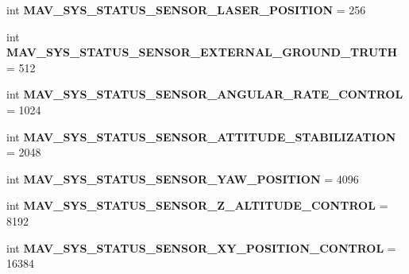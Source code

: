 \begin{DoxyCompactItemize}
int {\bfseries M\+A\+V\+\_\+\+S\+Y\+S\+\_\+\+S\+T\+A\+T\+U\+S\+\_\+\+S\+E\+N\+S\+O\+R\+\_\+\+L\+A\+S\+E\+R\+\_\+\+P\+O\+S\+I\+T\+I\+ON} = 256
\item 
\mbox{\label{namespacepymavlink_1_1dialects_1_1v10_a670a69e7105688ab55ffa0b475bb9c43}} 
int {\bfseries M\+A\+V\+\_\+\+S\+Y\+S\+\_\+\+S\+T\+A\+T\+U\+S\+\_\+\+S\+E\+N\+S\+O\+R\+\_\+\+E\+X\+T\+E\+R\+N\+A\+L\+\_\+\+G\+R\+O\+U\+N\+D\+\_\+\+T\+R\+U\+TH} = 512
\item 
\mbox{\label{namespacepymavlink_1_1dialects_1_1v10_a3cebad4c54ed15f8001f9aa4400b3fb5}} 
int {\bfseries M\+A\+V\+\_\+\+S\+Y\+S\+\_\+\+S\+T\+A\+T\+U\+S\+\_\+\+S\+E\+N\+S\+O\+R\+\_\+\+A\+N\+G\+U\+L\+A\+R\+\_\+\+R\+A\+T\+E\+\_\+\+C\+O\+N\+T\+R\+OL} = 1024
\item 
\mbox{\label{namespacepymavlink_1_1dialects_1_1v10_a7b918fbc4e3ddca4268b58075078409e}} 
int {\bfseries M\+A\+V\+\_\+\+S\+Y\+S\+\_\+\+S\+T\+A\+T\+U\+S\+\_\+\+S\+E\+N\+S\+O\+R\+\_\+\+A\+T\+T\+I\+T\+U\+D\+E\+\_\+\+S\+T\+A\+B\+I\+L\+I\+Z\+A\+T\+I\+ON} = 2048
\item 
\mbox{\label{namespacepymavlink_1_1dialects_1_1v10_a7065e09f8c32111da929ec71a53cf088}} 
int {\bfseries M\+A\+V\+\_\+\+S\+Y\+S\+\_\+\+S\+T\+A\+T\+U\+S\+\_\+\+S\+E\+N\+S\+O\+R\+\_\+\+Y\+A\+W\+\_\+\+P\+O\+S\+I\+T\+I\+ON} = 4096
\item 
\mbox{\label{namespacepymavlink_1_1dialects_1_1v10_ae811e9e457556517f0329a17368eb3f1}} 
int {\bfseries M\+A\+V\+\_\+\+S\+Y\+S\+\_\+\+S\+T\+A\+T\+U\+S\+\_\+\+S\+E\+N\+S\+O\+R\+\_\+\+Z\+\_\+\+A\+L\+T\+I\+T\+U\+D\+E\+\_\+\+C\+O\+N\+T\+R\+OL} = 8192
\item 
\mbox{\label{namespacepymavlink_1_1dialects_1_1v10_afdfcf23849b082eaab0bb3a3865a03d7}} 
int {\bfseries M\+A\+V\+\_\+\+S\+Y\+S\+\_\+\+S\+T\+A\+T\+U\+S\+\_\+\+S\+E\+N\+S\+O\+R\+\_\+\+X\+Y\+\_\+\+P\+O\+S\+I\+T\+I\+O\+N\+\_\+\+C\+O\+N\+T\+R\+OL} = 16384
\item 
\mbox{\label{namespacepymavlink_1_1dialects_1_1v10_a5da187067c4513b83c01bd520a2cb63e}} 

\end{DoxyCompactItemize}
